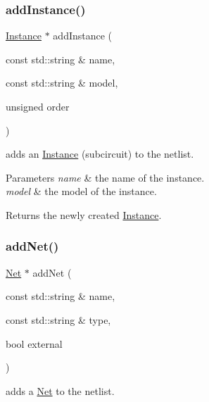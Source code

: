 \subsubsection{\texorpdfstring{add\+Instance()}{addInstance()}}
{\footnotesize\ttfamily \mbox{\hyperlink{class_open_chams_1_1_instance}{Instance}} $\ast$ add\+Instance (\begin{DoxyParamCaption}\item[{const std\+::string \&}]{name,  }\item[{const std\+::string \&}]{model,  }\item[{unsigned}]{order }\end{DoxyParamCaption})}



adds an \mbox{\hyperlink{class_open_chams_1_1_instance}{Instance}} (subcircuit) to the netlist. 


\begin{DoxyParams}{Parameters}
{\em name} & the name of the instance. \\
\hline
{\em model} & the model of the instance.\\
\hline
\end{DoxyParams}
\begin{DoxyReturn}{Returns}
the newly created \mbox{\hyperlink{class_open_chams_1_1_instance}{Instance}}. 
\end{DoxyReturn}
\mbox{\label{class_open_chams_1_1_netlist_a52be455a704925328843770552eca43d}} 
\subsubsection{\texorpdfstring{add\+Net()}{addNet()}}
{\footnotesize\ttfamily \mbox{\hyperlink{class_open_chams_1_1_net}{Net}} $\ast$ add\+Net (\begin{DoxyParamCaption}\item[{const std\+::string \&}]{name,  }\item[{const std\+::string \&}]{type,  }\item[{bool}]{external }\end{DoxyParamCaption})}



adds a \mbox{\hyperlink{class_open_chams_1_1_net}{Net}} to the netlist. 


